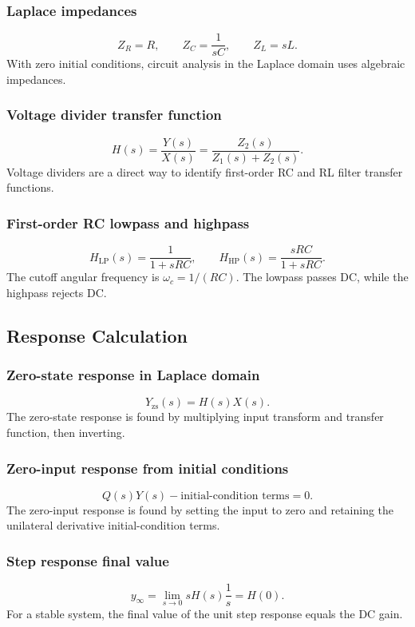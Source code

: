 \subsubsection{Laplace impedances}
\[
Z_R=R,\qquad Z_C=\frac{1}{sC},\qquad Z_L=sL.
\]
With zero initial conditions, circuit analysis in the Laplace domain uses algebraic impedances.

\subsubsection{Voltage divider transfer function}
\[
H(s)=\frac{Y(s)}{X(s)}=\frac{Z_2(s)}{Z_1(s)+Z_2(s)}.
\]
Voltage dividers are a direct way to identify first-order RC and RL filter transfer functions.

\subsubsection{First-order RC lowpass and highpass}
\[
H_{\mathrm{LP}}(s)=\frac{1}{1+sRC},\qquad
H_{\mathrm{HP}}(s)=\frac{sRC}{1+sRC}.
\]
The cutoff angular frequency is \(\omega_c=1/(RC)\). The lowpass passes DC, while the highpass rejects DC.

\subsection{Response Calculation}

\subsubsection{Zero-state response in Laplace domain}
\[
Y_{\mathrm{zs}}(s)=H(s)X(s).
\]
The zero-state response is found by multiplying input transform and transfer function, then inverting.

\subsubsection{Zero-input response from initial conditions}
\[
Q(s)Y(s)-\text{initial-condition terms}=0.
\]
The zero-input response is found by setting the input to zero and retaining the unilateral derivative initial-condition terms.

\subsubsection{Step response final value}
\[
y_{\infty}=\lim_{s\to0}sH(s)\frac{1}{s}=H(0).
\]
For a stable system, the final value of the unit step response equals the DC gain.
